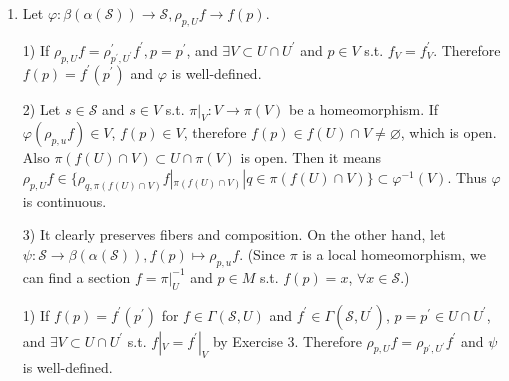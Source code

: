 \begin{enumerate}
3) $\varphi \times \varphi\colon \mathcal{S} \times \mathcal{S} \rightarrow \mathcal{T} \times \mathcal{T}$ is also a quotient map, and restricting to $\mathcal{S} \circ \mathcal{S}$, 
we obtain a quotient map $\varphi \circ \varphi\colon \mathcal{S} \circ \mathcal{S} \rightarrow \mathcal{T} \circ \mathcal{T}$. 
Let $\psi\colon \mathcal{S} \circ \mathcal{S} \rightarrow \mathcal{S}$ be a composition map. 
Then $\bar{\psi}\colon \mathcal{T} \circ \mathcal{T} \rightarrow \mathcal{T}$ is a composition map on $\mathcal{T}$. 
To check that it is continuous, we need to verify that $\bar{\psi}^{-1}(U)$ is open in $\mathcal{T} \circ \mathcal{T}$ for an open set $U \subset \mathcal{T}$. 
But it is by definition equal to whether $(\varphi \circ \varphi)^{-1}(\bar{\psi}^{-1}(U))$ is open, 
and it is open since $(\varphi \circ \varphi)^{-1}(\bar{\psi}^{-1}(U))=\psi^{-1}(\varphi^{-1}(U))$. 
Therefore the composition map is continuous.
Therefore $\bar{\pi}\colon \mathcal{T} \rightarrow M$ is a sheaf. 
It remains to show that $\varphi$ is a sheaf homomorphism, but it follows from the proof of 1).

\item Let $\varphi\colon \beta(\alpha(\mathcal{S})) \rightarrow \mathcal{S}, \rho_{p, U} f \rightarrow f(p)$.

1) If $\rho_{p, U} f=\rho_{p^{\prime}, U^{\prime}}^{\prime} f^{\prime}, p=p^{\prime}$, 
and $\exists V \subset U \cap U^{\prime}$ and $p \in V$ s.t. $f_{V}=f_{V}^{\prime}$. 
Therefore $f(p)=f^{\prime}(p^{\prime})$ and $\varphi$ is well-defined.

2) Let $s \in \mathcal{S}$ and $s \in V$ s.t. $\pi|_{V}\colon V \rightarrow \pi(V)$ be a homeomorphism. 
If $\varphi(\rho_{p, u} f) \in V$, $f(p) \in V$, 
therefore $f(p) \in f(U) \cap V \neq \varnothing$, which is open. 
Also $\pi(f(U) \cap V) \subset U \cap \pi(V)$ is open. 
Then it means $\rho_{p, U} f \in\{\rho_{q, \pi(f(U) \cap V)} f|_{\pi(f(U) \cap V)} |q \in \pi(f(U) \cap V)\} \subset \varphi^{-1}(V)$. Thus $\varphi$ is continuous.

3) It clearly preserves fibers and composition.
On the other hand, let $\psi\colon \mathcal{S} \rightarrow \beta(\alpha(\mathcal{S})), f(p) \mapsto \rho_{p, u} f$. 
(Since $\pi$ is a local homeomorphism, we can find a section $f=\pi|_{U}^{-1}$ and $p \in M$ s.t. $f(p)=x$, $\forall x \in \mathcal{S}$.)

1) If $f(p)=f^{\prime}(p^{\prime})$ for $f \in \Gamma(\mathcal{S}, U)$ 
and $f^{\prime} \in \Gamma(\mathcal{S}, U^{\prime})$, $p=p^{\prime} \in U \cap U^{\prime}$, 
and $\exists V \subset U \cap U^{\prime}$ s.t. $f|_{V}=f^{\prime}|_{V}$ by Exercise 3. 
Therefore $\rho_{p, U} f=\rho_{p^{\prime}, U^{\prime}} f^{\prime}$ and $\psi$ is well-defined.


\end{enumerate}
